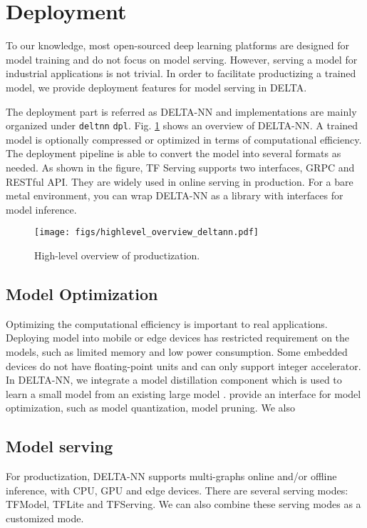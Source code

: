 \documentclass{article}
\begin{document}
\section{Deployment}
To our knowledge, most open-sourced deep learning platforms are designed for model training and do not focus on model serving. However, serving a model for industrial applications is not trivial. In order to facilitate productizing a trained model, we provide deployment features for model serving in DELTA.

The deployment part is referred as DELTA-NN and implementations are mainly organized under \texttt{deltnn} \texttt{dpl}. Fig. \ref{fig:highlevel_deltann} shows an overview of DELTA-NN. A trained model is optionally compressed or optimized in terms of computational efficiency. The deployment pipeline is able to convert the model into several formats as needed. As shown in the figure, TF Serving supports two interfaces, GRPC and RESTful API. They are widely used in online serving in production. For a bare metal environment, you can wrap DELTA-NN as a library with interfaces for model inference.


\begin{figure}[htbp]
  \centering
\texttt{[image: figs/highlevel\_overview\_deltann.pdf]}
  \caption{High-level overview of productization.}
  \label{fig:highlevel_deltann}
\end{figure}


\subsection{Model Optimization}
Optimizing the computational efficiency is important to real applications. Deploying model into mobile or edge devices has restricted requirement on the models, such as limited memory and low power consumption. Some embedded devices do not have floating-point units and can only support integer accelerator. In DELTA-NN, we integrate a model distillation component which is used to learn a small model from an existing large model \citep{hinton2015distilling}. provide an interface for model optimization, such as model quantization, model pruning. We also



\subsection{Model serving}


For productization, DELTA-NN supports multi-graphs online and/or offline inference, with CPU, GPU and edge devices. There are several serving modes: TFModel, TFLite and TFServing. We can also combine these serving modes as a customized mode.
\end{document}
